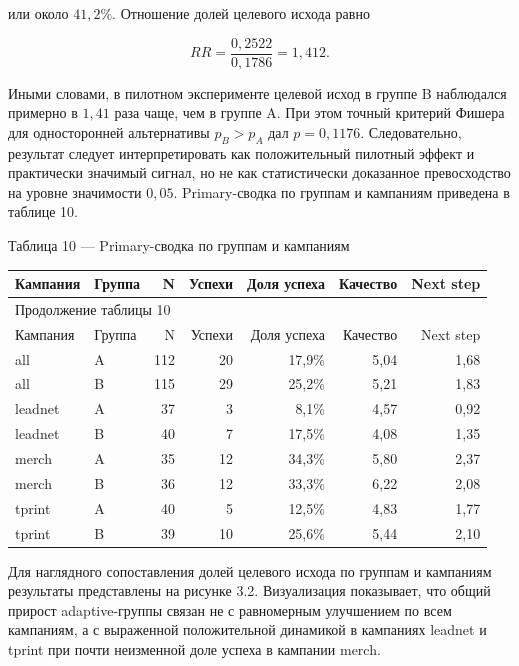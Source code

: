\documentclass[a4paper,14pt]{extarticle}
\renewcommand{\texttt}[1]{\textnormal{#1}}
\newcounter{none}
\newcommand{\VkrTableCaption}[1]{%
  \Needspace{0.44\textheight}%
  \par\smallskip
  {\singlespacing\noindent #1\par}%
  \vspace{2pt}%
}
\begin{document}
или около \(41{,}2\%\). Отношение долей целевого исхода равно

\begin{equation}
RR = \frac{0{,}2522}{0{,}1786} = 1{,}412.
\end{equation}

Иными словами, в пилотном эксперименте целевой исход в группе \texttt{B}
наблюдался примерно в \(1{,}41\) раза чаще, чем в группе \texttt{A}. При
этом точный критерий Фишера для односторонней альтернативы \(p_B > p_A\)
дал \(p = 0{,}1176\). Следовательно, результат следует интерпретировать
как положительный пилотный эффект и практически значимый сигнал, но не
как статистически доказанное превосходство на уровне значимости
\(0{,}05\). Primary-сводка по группам и кампаниям приведена в таблице
10.

\VkrTableCaption{Таблица 10 --- Primary-сводка по группам и кампаниям}

{\def\LTcaptype{none} %
\begin{longtable}[]{|l|l|r|r|r|r|r|}
\hline
Кампания & Группа & N & Успехи & Доля успеха & Качество & Next step \\
\hline
\endfirsthead
\hline\multicolumn{7}{|l|}{\small Продолжение таблицы 10}\\
\hline
Кампания & Группа & N & Успехи & Доля успеха & Качество & Next step \\
\hline
\endhead
\hline
\endfoot
\hline
\endlastfoot
all & A & 112 & 20 & 17,9\% & 5,04 & 1,68 \\
all & B & 115 & 29 & 25,2\% & 5,21 & 1,83 \\
leadnet & A & 37 & 3 & 8,1\% & 4,57 & 0,92 \\
leadnet & B & 40 & 7 & 17,5\% & 4,08 & 1,35 \\
merch & A & 35 & 12 & 34,3\% & 5,80 & 2,37 \\
merch & B & 36 & 12 & 33,3\% & 6,22 & 2,08 \\
tprint & A & 40 & 5 & 12,5\% & 4,83 & 1,77 \\
tprint & B & 39 & 10 & 25,6\% & 5,44 & 2,10 \\
\end{longtable}
}

Для наглядного сопоставления долей целевого исхода по группам и
кампаниям результаты представлены на рисунке 3.2. Визуализация
показывает, что общий прирост adaptive-группы связан не с равномерным
улучшением по всем кампаниям, а с выраженной положительной динамикой в
кампаниях \texttt{leadnet} и \texttt{tprint} при почти неизменной доле
успеха в кампании \texttt{merch}.
\end{document}
